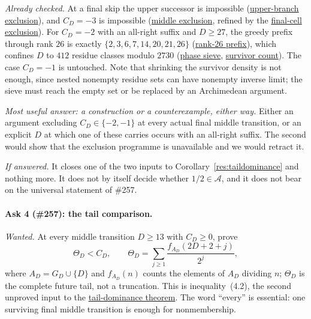 \documentclass[11pt]{article}
\newcommand{\commit}{99f4bf47422abbd8757cbb22b50ba079d764d3a7}
\newcommand{\repobase}{https://github.com/wcook04/plectis-erdos/blob/\commit}
\newcommand{\PK}{Erdos249257}
\newcommand{\lword}[4]{\href{\repobase/\PK/#1\#L#2}{#4}}
\theoremstyle{definition}
\theoremstyle{remark}
\begin{document}
\emph{Already checked.}  At a final skip the upper successor is impossible
(\lword{HalfCylinderLastProducerContradiction.lean}{299}{upperProducer_not_last}{upper-branch exclusion}),
and \(C_D=-3\) is impossible
(\lword{HalfCylinderLastProducerContradiction.lean}{364}{middleProducer_neg_three_not_last}{middle exclusion},
refined by the
\lword{HalfCylinderFinalMiddleCellEscape.lean}{587}{finalMiddleCell_neg_three_not_last}{final-cell exclusion}).
For \(C_D=-2\) with an all-right suffix and \(D\ge27\), the greedy prefix
through rank \(26\) is exactly \(\{2,3,6,7,14,20,21,26\}\)
(\lword{HalfFinalMiddlePhaseSieve.lean}{899}{seamGreedyBits_head2367_14_20_21_26}{rank-26 prefix}),
which confines \(D\) to \(412\) residue classes modulo \(2730\)
(\lword{HalfFinalMiddlePhaseSieve.lean}{1622}{finalMiddleCell_neg_two_forces_phase_refinement_through_twentySix}{phase sieve},
\lword{HalfFinalMiddlePhaseSieve.lean}{1759}{finalMiddleTwentySixPhaseSurvivors_card}{survivor count}).
The case \(C_D=-1\) is untouched.  Note that shrinking the survivor density
is not enough, since nested nonempty residue sets can have nonempty inverse
limit; the sieve must reach the empty set or be replaced by an Archimedean
argument.

\emph{Most useful answer: a construction or a counterexample, either way.}
Either an argument excluding \(C_D\in\{-2,-1\}\) at every actual final middle
transition, or an explicit \(D\) at which one of these carries occurs with an
all-right suffix.  The second would show that the exclusion programme is
unavailable and we would retract it.

\emph{If answered.}  It closes one of the two inputs to
Corollary~\ref{res:taildominance} and nothing more.  It does not by itself
decide whether \(1/2\in\mathcal A\), and it does not bear on the universal
statement of \#257.

\paragraph{Ask 4 (\#257): the tail comparison.}
\emph{Wanted.}  At every middle transition \(D\ge13\) with \(C_D\ge0\), prove
\[
 \Theta_D<C_D,
 \qquad
 \Theta_D=\sum_{j\ge1}\frac{f_{A_D}(2D+2+j)}{2^{j}},
\]
where \(A_D=G_D\cup\{D\}\) and \(f_{A_D}(n)\) counts the elements of
\(A_D\) dividing \(n\); \(\Theta_D\) is the complete future tail, not a
truncation.  This is inequality~\textup{(4.2)}, the second unproved input to
the
\lword{HalfCylinderLastProducerContradiction.lean}{436}{half_mem_mersenneAchievementSet_of_middleProducerTailEscapeExceptNegThree}{tail-dominance theorem}.
The word ``every'' is essential: one surviving final middle transition is
enough for nonmembership.
\end{document}
